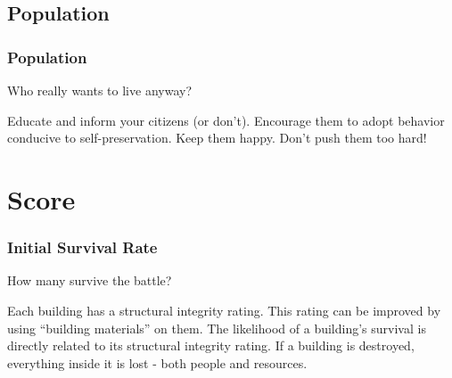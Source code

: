 \documentclass[ascpectratio=169]{beamer}
\begin{document}

\subsection{Population}


\begin{frame}

  \frametitle{Population}

  \begin{center}
    {\large Who really wants to live anyway?}
  \end{center}

  \begin{outline}
    \1 Educate and inform your citizens (or don't).
    \1 Encourage them to adopt behavior conducive to self-preservation.
    \1 Keep them happy.
    \1 Don't push them too hard!
  \end{outline}

\end{frame}


\section{Score}


\begin{frame}

  \frametitle{Initial Survival Rate}

  \begin{center}
    {\large How many survive the battle?}
  \end{center}

  \begin{outline}
    \1 Each building has a structural integrity rating.
    \1 This rating can be improved by using ``building materials'' on them.
    \1 The likelihood of a building's survival is directly related to its
    structural integrity rating.
    \1 If a building is destroyed, everything inside it is lost - both people and
    resources.
  \end{outline}

\end{frame}


\end{document}
